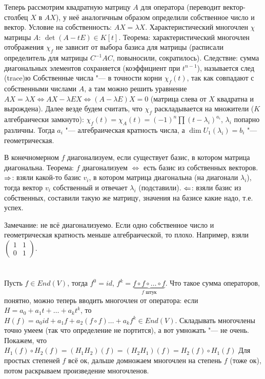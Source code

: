 Теперь рассмотрим квадратную матрицу $A$ для оператора (переводит вектор-столбец $X$ в $AX$), у неё аналогичным образом определили собственное число и вектор.
Условие на собственность: $AX=\lambda X$.
Характеристический многочлен $\chi$ матрицы $A$: $\det (A - tE) \in K[t]$.
Теорема: характеристический многочлен отображения $\chi_f$ не зависит от выбора базиса для матрицы (расписали определитель для матрицы $C^{-1}AC$, повыносили, сократилось).
Следствие: сумма диагональных элементов сохраняется (коэффициент при $t^{n-1}$), называется след (trace)ю
Собственные числа "--- в точности корни $\chi_f(t)$, так как совпадают с собственными числами $A$, а там можно решить уравнение $AX =\lambda X \iff AX-\lambda EX \iff (A-\lambda E)X = 0$
(матрица слева от $X$ квадратна и вырождена).
Далее везде будем считать, что $\chi_f$ раскладывается на множители ($K$ алгебраически замкнуто):
$\chi_f(t) = \chi_A(t) = (-1)^n \prod (t - \lambda_i)^{a_i}$, $\lambda_i$ попарно различны.
Тогда $a_i$ "--- алгебраическая кратность числа, а $\dim U_1(\lambda_i) = b_i$ "--- геометрическая.

В конечномерном $f$ диагонализуем, если существует базис, в котором матрица диагональна.
Теорема: $f$ диагонализуем $\iff$ есть базис из собственных векторов.
$\Rightarrow$: взяли какой-то базис $v_i$, в котором матрица диагональна (на диагонали $\lambda_i$), тогда вектор $v_i$ собственный и отвечает $\lambda_i$ (подставили).
$\Leftarrow$: взяли базис из собственных, составили такую же матрицу, значения на базисе какие надо, т.е. успех.

Замечание: не всё диагонализуемо.
Если одно собственное число и геометрическая кратность меньше алгебраической, то плохо.
Например, взяли $\begin{pmatrix}1&1\\0&1\end{pmatrix}$.

\section{} %
Пусть $f \in End(V)$, тогда $f^0 = id$, $f^k = \underbrace{f \circ f \circ \dots \circ f}_{f\text{~штук}}$.
Что такое сумма операторов, понятно, можно теперь вводить многочлен от оператора:
если $H=a_0+a_1t + \dots + a_kt^k$, то $H(f)=a_0 id + a_1 f + a_2 (f\circ f) \dots + a_k f^k \in End(V)$.
Складывать многочлены точно умеем (так что определение не портится), а вот умножать "--- не очень.
Покажем, что $H_1(f) \circ H_2(f) = (H_1H_2)(f) = (H_2H_1)(f) = H_2(f) \circ H_1(f)$
Для простых степеней $f$ всё ок, дальше домножаем многочлен на степень $f$ (тоже ок), потом раскрываем произведение многочленов.

